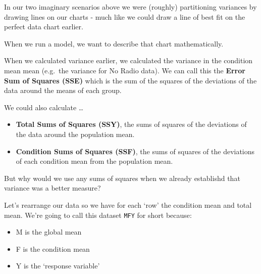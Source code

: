 \documentclass[
]{book}
\newenvironment{Shaded}{\begin{snugshade}}{\end{snugshade}}
\newcommand{\CommentTok}[1]{\textcolor[rgb]{0.56,0.35,0.01}{\textit{#1}}}
\newcommand{\KeywordTok}[1]{\textcolor[rgb]{0.13,0.29,0.53}{\textbf{#1}}}
\newcommand{\NormalTok}[1]{#1}
\newcommand{\OperatorTok}[1]{\textcolor[rgb]{0.81,0.36,0.00}{\textbf{#1}}}
\newcommand{\StringTok}[1]{\textcolor[rgb]{0.31,0.60,0.02}{#1}}
\providecommand{\tightlist}{%
  \setlength{\itemsep}{0pt}\setlength{\parskip}{0pt}}
\begin{document}
In our two imaginary scenarios above we were (roughly) partitioning variances by drawing lines on our charts - much like we could draw a line of best fit on the perfect data chart earlier.

When we run a model, we want to describe that chart mathematically.

When we calculated variance earlier, we calculated the variance in the condition mean mean (e.g.~the variance for No Radio data). We can call this the \textbf{Error Sum of Squares (SSE)} which is the sum of the squares of the deviations of the data around the means of each group.

We could also calculate \ldots{}

\begin{itemize}
\tightlist
\item
  \textbf{Total Sums of Squares (SSY)}, the sums of squares of the deviations of the data around the population mean.
\item
  \textbf{Condition Sums of Squares (SSF)}, the sums of squares of the deviations of each condition mean from the population mean.
\end{itemize}

But why would we use any sums of squares when we already establishd that variance was a better measure?

Let's rearrange our data so we have for each `row' the condition mean and total mean. We're going to call this dataset \texttt{MFY} for short because:

\begin{itemize}
\item
  M is the global mean
\item
  F is the condition mean
\item
  Y is the `response variable'
\end{itemize}

\begin{Shaded}
\end{Shaded}
\end{document}
